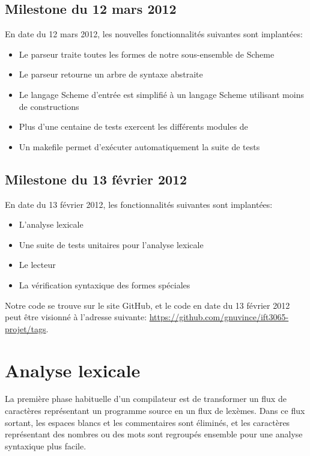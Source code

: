 \documentclass[11pt]{report}
\begin{document}
\section{Milestone du 12 mars 2012}

En date du 12 mars 2012,  les nouvelles fonctionnalités suivantes sont
implantées:
\begin{itemize}
\item Le parseur traite toutes les formes de notre sous-ensemble de Scheme
\item Le parseur retourne un arbre de syntaxe abstraite
\item Le langage Scheme d'entrée est simplifié à un langage Scheme
  utilisant moins de constructions
\item Plus d'une centaine de tests exercent les différents modules de \sins{}
\item Un makefile permet d'exécuter automatiquement la suite de tests
\end{itemize}


\section{Milestone du 13 février 2012}

En date du 13 février 2012, les fonctionnalités suivantes sont
implantées:

\begin{itemize}
\item L'analyse lexicale
\item Une suite de tests unitaires pour l'analyse lexicale
\item Le lecteur
\item La vérification syntaxique des formes spéciales
\end{itemize}

Notre code se trouve sur le site GitHub, et le code en date du 13
février 2012 peut être visionné à l'adresse suivante:
\url{https://github.com/gnuvince/ift3065-projet/tags}.


\chapter{Analyse lexicale}

La première phase habituelle d'un compilateur est de transformer un
flux de caractères représentant un programme source en un flux de
lexèmes.  Dans ce flux sortant, les espaces blancs et les commentaires
sont éliminés, et les caractères représentant des nombres ou des mots
sont regroupés ensemble pour une analyse syntaxique plus facile.
\end{document}
